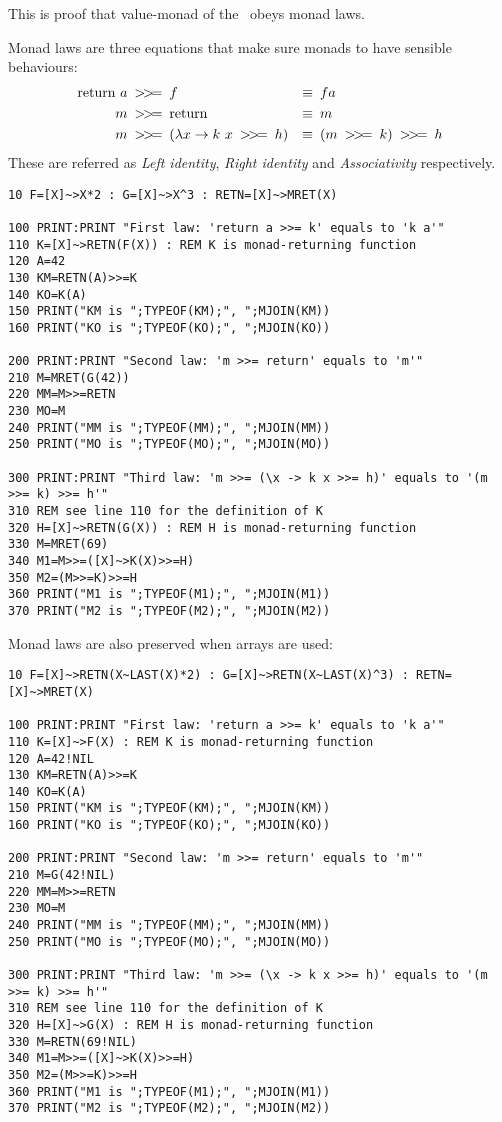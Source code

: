 This is proof that value-monad of the \tbas\ obeys monad laws.

Monad laws are three equations that make sure monads to have sensible behaviours:
\begin{align*}
\text{return}\ a \text{\enskip\basicmbind\enskip}& f &\equiv&\enskip f a\\
m \text{\enskip\basicmbind\enskip}& \text{return} &\equiv&\enskip m\\
m \text{\enskip\basicmbind\enskip}& (\lambda x \rightarrow k\ x \text{\enskip\basicmbind\enskip} h) &\equiv&\enskip (m \text{\enskip\basicmbind\enskip} k) \text{\enskip\basicmbind\enskip} h
\end{align*}
These are referred as \emph{Left identity}, \emph{Right identity} and \emph{Associativity} respectively.

\begin{lstlisting}
10 F=[X]~>X*2 : G=[X]~>X^3 : RETN=[X]~>MRET(X)

100 PRINT:PRINT "First law: 'return a >>= k' equals to 'k a'"
110 K=[X]~>RETN(F(X)) : REM K is monad-returning function
120 A=42
130 KM=RETN(A)>>=K
140 KO=K(A)
150 PRINT("KM is ";TYPEOF(KM);", ";MJOIN(KM))
160 PRINT("KO is ";TYPEOF(KO);", ";MJOIN(KO))

200 PRINT:PRINT "Second law: 'm >>= return' equals to 'm'"
210 M=MRET(G(42))
220 MM=M>>=RETN
230 MO=M
240 PRINT("MM is ";TYPEOF(MM);", ";MJOIN(MM))
250 PRINT("MO is ";TYPEOF(MO);", ";MJOIN(MO))

300 PRINT:PRINT "Third law: 'm >>= (\x -> k x >>= h)' equals to '(m >>= k) >>= h'"
310 REM see line 110 for the definition of K
320 H=[X]~>RETN(G(X)) : REM H is monad-returning function
330 M=MRET(69)
340 M1=M>>=([X]~>K(X)>>=H)
350 M2=(M>>=K)>>=H
360 PRINT("M1 is ";TYPEOF(M1);", ";MJOIN(M1))
370 PRINT("M2 is ";TYPEOF(M2);", ";MJOIN(M2))
\end{lstlisting}

Monad laws are also preserved when arrays are used:

\begin{lstlisting}
10 F=[X]~>RETN(X~LAST(X)*2) : G=[X]~>RETN(X~LAST(X)^3) : RETN=[X]~>MRET(X)

100 PRINT:PRINT "First law: 'return a >>= k' equals to 'k a'"
110 K=[X]~>F(X) : REM K is monad-returning function
120 A=42!NIL
130 KM=RETN(A)>>=K
140 KO=K(A)
150 PRINT("KM is ";TYPEOF(KM);", ";MJOIN(KM))
160 PRINT("KO is ";TYPEOF(KO);", ";MJOIN(KO))

200 PRINT:PRINT "Second law: 'm >>= return' equals to 'm'"
210 M=G(42!NIL)
220 MM=M>>=RETN
230 MO=M
240 PRINT("MM is ";TYPEOF(MM);", ";MJOIN(MM))
250 PRINT("MO is ";TYPEOF(MO);", ";MJOIN(MO))

300 PRINT:PRINT "Third law: 'm >>= (\x -> k x >>= h)' equals to '(m >>= k) >>= h'"
310 REM see line 110 for the definition of K
320 H=[X]~>G(X) : REM H is monad-returning function
330 M=RETN(69!NIL)
340 M1=M>>=([X]~>K(X)>>=H)
350 M2=(M>>=K)>>=H
360 PRINT("M1 is ";TYPEOF(M1);", ";MJOIN(M1))
370 PRINT("M2 is ";TYPEOF(M2);", ";MJOIN(M2))
\end{lstlisting}
